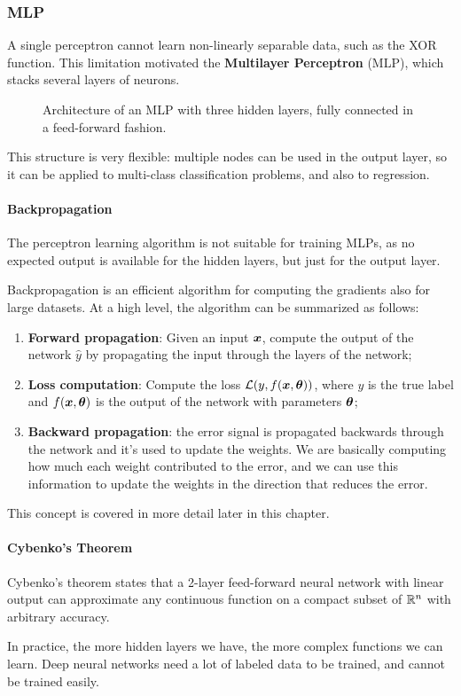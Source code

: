 \subsubsection{MLP}
A single perceptron cannot learn non-linearly separable data, such as the XOR function. This limitation motivated the
\textbf{Multilayer Perceptron} (MLP), which stacks several layers of neurons.
\begin{figure}[H]
    \centering
    \scalebox{0.8}{
        
    }
    \caption{Architecture of an MLP with three hidden layers, fully connected in a feed-forward fashion.}
    \label{fig:mlp}
\end{figure}
This structure is very flexible: multiple nodes can be used in the output layer, so it can be applied to multi-class classification problems, and also to regression.

\paragraph{Backpropagation}
\label{introduction-backpropagation}
The perceptron learning algorithm is not suitable for training MLPs, as no expected output is available for the hidden layers, but just for the output layer.

Backpropagation is an efficient algorithm for computing the gradients also for large datasets.
At a high level, the algorithm can be summarized as follows:
\begin{enumerate}
    \item \textbf{Forward propagation}: Given an input $\boldsymbol{x}$, compute the output of the network $\hat{y}$ by
    propagating the input through the layers of the network;
    
    \item \textbf{Loss computation}: Compute the loss $\mathcal{L}(y, f(\boldsymbol{x}, \boldsymbol{\theta}))$, where $y$ is the true label and $f(\boldsymbol{x}, \boldsymbol{\theta})$ is the output of the network with parameters $\boldsymbol{\theta}$;
    
    \item \textbf{Backward propagation}: the error signal is propagated backwards through the network and it's used to update the weights.
    We are basically computing how much each weight contributed to the error, and we can use this information to update the weights in the direction that reduces the error.
\end{enumerate}

This concept is covered in more detail later in this chapter.

\paragraph{Cybenko's Theorem}
Cybenko's theorem states that a 2-layer feed-forward neural network with linear output
can approximate any continuous function on a compact subset of $\mathbb{R}^n$ with arbitrary accuracy.

In practice, the more hidden layers we have, the more complex functions we can learn. Deep
neural networks need a lot of labeled data to be trained, and cannot be trained easily.
